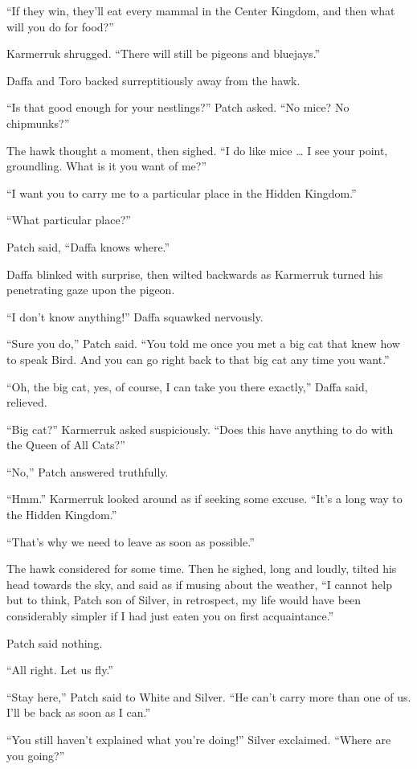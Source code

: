 \documentclass[ebook,oneside,openany,17pt]{memoir}
\begin{document}
“If they win, they’ll eat every mammal in the Center Kingdom, and then
what will you do for food?”

Karmerruk shrugged. “There will still be pigeons and bluejays.”

Daffa and Toro backed surreptitiously away from the hawk.

“Is that good enough for your nestlings?” Patch asked. “No mice? No
chipmunks?”

The hawk thought a moment, then sighed. “I do like mice … I see your
point, groundling. What is it you want of me?”

“I want you to carry me to a particular place in the Hidden Kingdom.”

“What particular place?”

Patch said, “Daffa knows where.”

Daffa blinked with surprise, then wilted backwards as Karmerruk turned
his penetrating gaze upon the pigeon.

“I don’t know anything!” Daffa squawked nervously.

“Sure you do,” Patch said. “You told me once you met a big cat that
knew how to speak Bird. And you can go right back to that big cat any
time you want.”

“Oh, the big cat, yes, of course, I can take you there exactly,” Daffa
said, relieved.

“Big cat?” Karmerruk asked suspiciously. “Does this have anything to
do with the Queen of All Cats?”

“No,” Patch answered truthfully.

“Hmm.” Karmerruk looked around as if seeking some excuse. “It’s a long
way to the Hidden Kingdom.”

“That’s why we need to leave as soon as possible.”

The hawk considered for some time. Then he sighed, long and loudly,
tilted his head towards the sky, and said as if musing about the
weather, “I cannot help but to think, Patch son of Silver, in
retrospect, my life would have been considerably simpler if I had just
eaten you on first acquaintance.”

Patch said nothing.

“All right. Let us fly.”

“Stay here,” Patch said to White and Silver. “He can’t carry more than
one of us. I’ll be back as soon as I can.”

“You still haven’t explained what you’re doing!” Silver
exclaimed. “Where are you going?”
\end{document}
